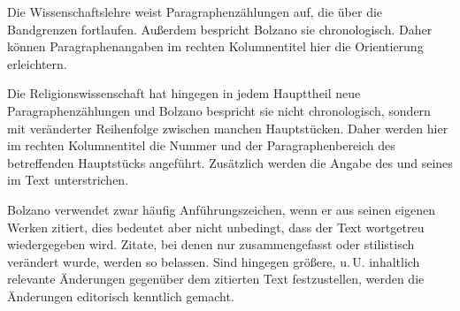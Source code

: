 {\begin{aufza}
\begin{aufzb}
\item Die Wissenschaftslehre weist Paragraphenzählungen auf, die über die Bandgrenzen fortlaufen. Außerdem bespricht Bolzano sie chronologisch. Daher können Paragraphenangaben im rechten Kolumnentitel hier die Orientierung erleichtern. 
\item Die Religionswissenschaft hat hingegen in jedem Haupttheil neue Paragraphenzählungen und Bolzano bespricht sie nicht chronologisch, sondern mit veränderter Reihenfolge zwischen manchen Hauptstücken. Daher werden hier im rechten Kolumnentitel die Nummer und der Paragraphenbereich des betreffenden Hauptstücks angeführt. Zusätzlich werden die Angabe des  und seines  im Text unterstrichen.
\item Bolzano verwendet zwar häufig Anführungszeichen, wenn er aus seinen eigenen Werken zitiert, dies bedeutet aber nicht unbedingt, dass der Text wortgetreu wiedergegeben wird. Zitate, bei denen nur zusammengefasst oder stilistisch verändert wurde, werden so belassen. Sind hingegen größere, u.\,U. inhaltlich relevante Änderungen gegenüber dem zitierten Text festzustellen, werden die Änderungen editorisch kenntlich gemacht.
\end{aufzb}
\end{aufza}
}
\endinput